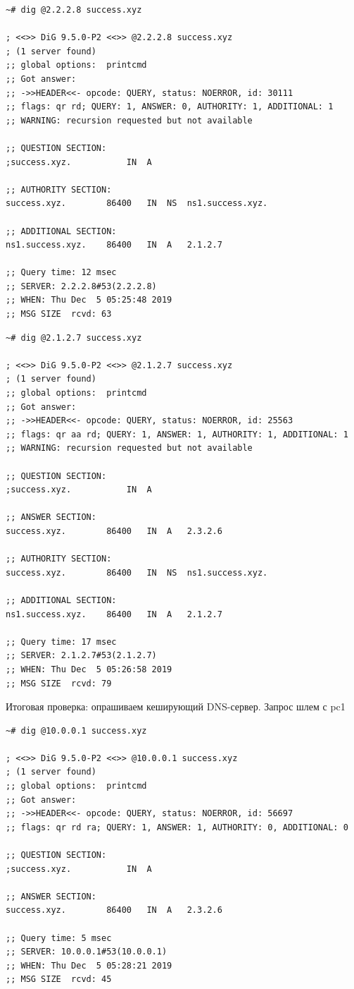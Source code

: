 \documentclass[a4paper,12pt]{article}
\begin{document}
\begin{verbatim}
~# dig @2.2.2.8 success.xyz

; <<>> DiG 9.5.0-P2 <<>> @2.2.2.8 success.xyz
; (1 server found)
;; global options:  printcmd
;; Got answer:
;; ->>HEADER<<- opcode: QUERY, status: NOERROR, id: 30111
;; flags: qr rd; QUERY: 1, ANSWER: 0, AUTHORITY: 1, ADDITIONAL: 1
;; WARNING: recursion requested but not available

;; QUESTION SECTION:
;success.xyz.			IN	A

;; AUTHORITY SECTION:
success.xyz.		86400	IN	NS	ns1.success.xyz.

;; ADDITIONAL SECTION:
ns1.success.xyz.	86400	IN	A	2.1.2.7

;; Query time: 12 msec
;; SERVER: 2.2.2.8#53(2.2.2.8)
;; WHEN: Thu Dec  5 05:25:48 2019
;; MSG SIZE  rcvd: 63
\end{verbatim}

\begin{verbatim}
~# dig @2.1.2.7 success.xyz

; <<>> DiG 9.5.0-P2 <<>> @2.1.2.7 success.xyz
; (1 server found)
;; global options:  printcmd
;; Got answer:
;; ->>HEADER<<- opcode: QUERY, status: NOERROR, id: 25563
;; flags: qr aa rd; QUERY: 1, ANSWER: 1, AUTHORITY: 1, ADDITIONAL: 1
;; WARNING: recursion requested but not available

;; QUESTION SECTION:
;success.xyz.			IN	A

;; ANSWER SECTION:
success.xyz.		86400	IN	A	2.3.2.6

;; AUTHORITY SECTION:
success.xyz.		86400	IN	NS	ns1.success.xyz.

;; ADDITIONAL SECTION:
ns1.success.xyz.	86400	IN	A	2.1.2.7

;; Query time: 17 msec
;; SERVER: 2.1.2.7#53(2.1.2.7)
;; WHEN: Thu Dec  5 05:26:58 2019
;; MSG SIZE  rcvd: 79
\end{verbatim}

Итоговая проверка: опрашиваем кеширующий DNS-сервер.
Запрос шлем с pc1

\begin{verbatim}
~# dig @10.0.0.1 success.xyz

; <<>> DiG 9.5.0-P2 <<>> @10.0.0.1 success.xyz
; (1 server found)
;; global options:  printcmd
;; Got answer:
;; ->>HEADER<<- opcode: QUERY, status: NOERROR, id: 56697
;; flags: qr rd ra; QUERY: 1, ANSWER: 1, AUTHORITY: 0, ADDITIONAL: 0

;; QUESTION SECTION:
;success.xyz.			IN	A

;; ANSWER SECTION:
success.xyz.		86400	IN	A	2.3.2.6

;; Query time: 5 msec
;; SERVER: 10.0.0.1#53(10.0.0.1)
;; WHEN: Thu Dec  5 05:28:21 2019
;; MSG SIZE  rcvd: 45
\end{verbatim}
\end{document}

